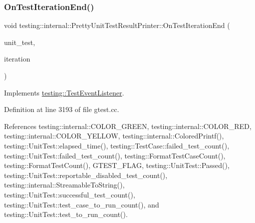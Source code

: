 \mbox{\label{classtesting_1_1internal_1_1PrettyUnitTestResultPrinter_ac29b30216023baddda04ef5889f484ff}} 
\subsubsection{\texorpdfstring{On\+Test\+Iteration\+End()}{OnTestIterationEnd()}}
{\footnotesize\ttfamily void testing\+::internal\+::\+Pretty\+Unit\+Test\+Result\+Printer\+::\+On\+Test\+Iteration\+End (\begin{DoxyParamCaption}\item[{const \hyperlink{classtesting_1_1UnitTest}{Unit\+Test} \&}]{unit\+\_\+test,  }\item[{int}]{iteration }\end{DoxyParamCaption})\hspace{0.3cm}{\ttfamily [virtual]}}



Implements \hyperlink{classtesting_1_1TestEventListener_a550fdb3e55726e4cefa09f5697941425}{testing\+::\+Test\+Event\+Listener}.



Definition at line 3193 of file gtest.\+cc.



References testing\+::internal\+::\+C\+O\+L\+O\+R\+\_\+\+G\+R\+E\+EN, testing\+::internal\+::\+C\+O\+L\+O\+R\+\_\+\+R\+ED, testing\+::internal\+::\+C\+O\+L\+O\+R\+\_\+\+Y\+E\+L\+L\+OW, testing\+::internal\+::\+Colored\+Printf(), testing\+::\+Unit\+Test\+::elapsed\+\_\+time(), testing\+::\+Test\+Case\+::failed\+\_\+test\+\_\+count(), testing\+::\+Unit\+Test\+::failed\+\_\+test\+\_\+count(), testing\+::\+Format\+Test\+Case\+Count(), testing\+::\+Format\+Test\+Count(), G\+T\+E\+S\+T\+\_\+\+F\+L\+AG, testing\+::\+Unit\+Test\+::\+Passed(), testing\+::\+Unit\+Test\+::reportable\+\_\+disabled\+\_\+test\+\_\+count(), testing\+::internal\+::\+Streamable\+To\+String(), testing\+::\+Unit\+Test\+::successful\+\_\+test\+\_\+count(), testing\+::\+Unit\+Test\+::test\+\_\+case\+\_\+to\+\_\+run\+\_\+count(), and testing\+::\+Unit\+Test\+::test\+\_\+to\+\_\+run\+\_\+count().


